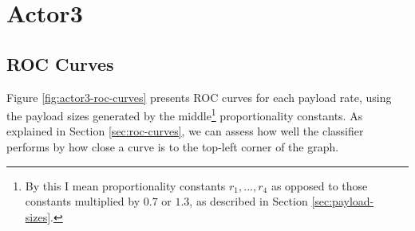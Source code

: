 \documentclass[11pt,a4paper,twoside,openright]{report}
\begin{document}
\section{Actor3} \label{sec:actor3-results}

\subsection{ROC Curves} \label{sec:actor3-roc-curves}

Figure \ref{fig:actor3-roc-curves} presents ROC curves for each payload rate, using the payload sizes generated by the middle\footnote{By this I mean proportionality constants $r_1,...,r_4$ as opposed to those constants multiplied by $0.7$ or $1.3$, as described in Section \ref{sec:payload-sizes}.} proportionality constants. As explained in Section \ref{sec:roc-curves}, we can assess how well the classifier performs by how close a curve is to the top-left corner of the graph.
\end{document}
